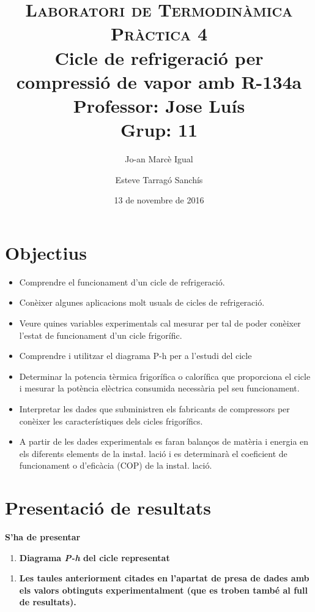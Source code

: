\documentclass[a4paper]{article}
\title{
	\textsc{Laboratori de Termodinàmica} \\
	\textsc{Pràctica 4} \\
	Cicle de refrigeració per compressió de vapor amb R-134a \\
	\large
	Professor: Jose Luís \\ Grup: 11 }
\author{Jo-an Marcè Igual \and Esteve Tarragó Sanchís}
\date{13 de novembre de 2016}
\begin{document}
\maketitle

\section{Objectius}

\begin{itemize}
	\item Comprendre el funcionament d’un cicle de refrigeració.
	\item Conèixer algunes aplicacions molt usuals de cicles de refrigeració.
	\item Veure quines variables experimentals cal mesurar per tal de poder conèixer l’estat de funcionament d’un cicle frigorífic.
	\item Comprendre i utilitzar el diagrama P-h per a l’estudi del cicle
	\item Determinar la potencia tèrmica frigorífica o calorífica que proporciona el cicle i mesurar la potència elèctrica consumida necessària pel seu funcionament.
	\item Interpretar les dades que subministren els fabricants de compressors per conèixer les característiques dels cicles frigorífics.
	\item A partir de les dades experimentals es faran balanços de matèria i energia en els diferents elements de la insta\l. lació i es determinarà el coeficient de funcionament o d’eficàcia (COP) de la insta\l. lació.
\end{itemize}

\section{Presentació de resultats}

\textbf{S'ha de presentar}
\begin{enumerate}
	\item \textbf{Diagrama \emph{P-h} del cicle representat}
\end{enumerate}

\begin{enumerate}[resume]
	\item \textbf{Les taules anteriorment citades en l'apartat de presa de dades amb els valors obtinguts experimentalment (que es troben també al full de resultats).}
\end{enumerate}
\end{document}
